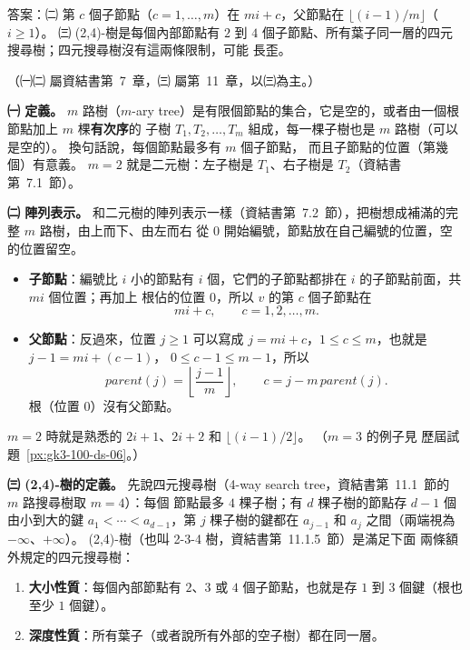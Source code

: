 \begin{pastsoln}
答案：㈡ 第 $c$ 個子節點（$c = 1, \dots, m$）在 $m i + c$，父節點在 $\lfloor (i - 1)/m \rfloor$（$i \ge 1$）。
㈢ (2,4)-樹是每個內部節點有 $2$ 到 $4$ 個子節點、所有葉子同一層的四元搜尋樹；四元搜尋樹沒有這兩條限制，可能
長歪。

（㈠㈡ 屬資結書第~7~章，㈢ 屬第~11~章，以㈢為主。）

\textbf{㈠ 定義。} $m$ 路樹（$m$-ary tree）是有限個節點的集合，它是空的，或者由一個根節點加上 $m$ 棵\textbf{有次序}的
子樹 $T_1, T_2, \dots, T_m$ 組成，每一棵子樹也是 $m$ 路樹（可以是空的）。 換句話說，每個節點最多有 $m$ 個子節點，
而且子節點的位置（第幾個）有意義。 $m = 2$ 就是二元樹：左子樹是 $T_1$、右子樹是 $T_2$（資結書第~7.1~節）。

\textbf{㈡ 陣列表示。} 和二元樹的陣列表示一樣（資結書第~7.2~節），把樹想成補滿的完整 $m$ 路樹，由上而下、由左而右
從 $0$ 開始編號，節點放在自己編號的位置，空的位置留空。
\begin{itemize}
\item \textbf{子節點}：編號比 $i$ 小的節點有 $i$ 個，它們的子節點都排在 $i$ 的子節點前面，共 $m i$ 個位置；再加上
根佔的位置 $0$，所以 $v$ 的第 $c$ 個子節點在
\[
m i + c,\qquad c = 1, 2, \dots, m.
\]
\item \textbf{父節點}：反過來，位置 $j \ge 1$ 可以寫成 $j = m i + c$，$1 \le c \le m$，也就是 $j - 1 = m i + (c - 1)$，
$0 \le c - 1 \le m - 1$，所以
\[
\mathit{parent}(j) = \left\lfloor \frac{j - 1}{m} \right\rfloor,\qquad c = j - m\,\mathit{parent}(j).
\]
根（位置 $0$）沒有父節點。
\end{itemize}
$m = 2$ 時就是熟悉的 $2i + 1$、$2i + 2$ 和 $\lfloor (i - 1)/2 \rfloor$。 （$m = 3$ 的例子見
歷屆試題~\ref{px:gk3-100-ds-06}。）

\textbf{㈢ (2,4)-樹的定義。} 先說四元搜尋樹（4-way search tree，資結書第~11.1~節的 $m$ 路搜尋樹取 $m = 4$）：每個
節點最多 $4$ 棵子樹；有 $d$ 棵子樹的節點存 $d - 1$ 個由小到大的鍵 $a_1 < \cdots < a_{d-1}$，第 $j$ 棵子樹的鍵都在
$a_{j-1}$ 和 $a_j$ 之間（兩端視為 $-\infty$、$+\infty$）。 (2,4)-樹（也叫 2-3-4 樹，資結書第~11.1.5~節）是滿足下面
兩條額外規定的四元搜尋樹：
\begin{enumerate}
\item \textbf{大小性質}：每個內部節點有 $2$、$3$ 或 $4$ 個子節點，也就是存 $1$ 到 $3$ 個鍵（根也至少 $1$ 個鍵）。
\item \textbf{深度性質}：所有葉子（或者說所有外部的空子樹）都在同一層。
\end{enumerate}


\end{pastsoln}
